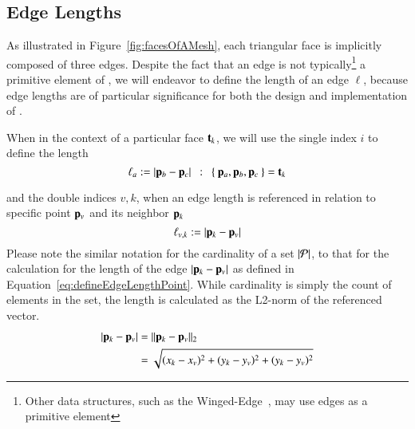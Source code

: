 %
\subsection{Edge Lengths}
\label{chBsEL}
As illustrated in Figure~\ref{fig:facesOfAMesh}, each triangular face is implicitly composed of three edges. Despite the fact that an edge is not typically\footnote{Other data structures, such as the Winged-Edge~\cite[p.~1]{Baumgart75}, may use edges as a primitive element} a primitive element of \tdd{}, we will endeavor to define the length of an edge $\ell$, because edge lengths are of particular significance for both the design and implementation of .

When in the context of a particular face $\mathbf{t}_k$, we will use the single index $i$ to define the length
\begin{equation}
	\ell_a := |\mathbf{p}_b - \mathbf{p}_c| \enspace:\enspace \left \{\:\mathbf{p}_a, \mathbf{p}_b, \mathbf{p}_c\:\right \} = \mathbf{t}_k
	\label{eq:defineEdgeLengthFace}
\end{equation}%
%
 
and the double indices $v,k$, when an edge length is referenced in relation to specific point $\mathbf{p}_v$ and its neighbor $\mathbf{p}_k$
\begin{equation}
	\ell_{v,k} := |\mathbf{p}_k - \mathbf{p}_v|
	\label{eq:defineEdgeLengthPoint}
\end{equation}%
%
Please note the similar notation for the cardinality of a set $|\mathcal{P}|$, to that for the calculation for the length of the edge $|\mathbf{p}_k - \mathbf{p}_v|$ as defined in Equation~\ref{eq:defineEdgeLengthPoint}. While cardinality is simply the count of elements in the set, the length is calculated as the L2-norm of the referenced vector.~\cite[p.~26]{Mara12}
\begin{equation}
\begin{aligned}
	|\mathbf{p}_k - \mathbf{p}_v| & = \lVert\mathbf{p}_k - \mathbf{p}_v\rVert_2 \\
					& = \sqrt{(x_k-x_v)^2 + (y_k-y_v)^2 + (y_k-y_v)^2}
	\label{eq:defineEdgeLengthCalc}
\end{aligned}
\end{equation}
%
